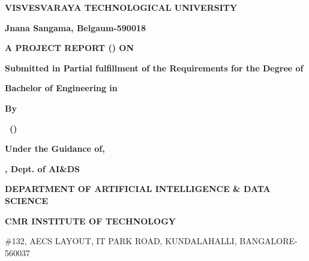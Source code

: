 \thispagestyle{empty}
\begin{center}
\vspace*{0.5cm}
{\Large\bfseries VISVESVARAYA TECHNOLOGICAL UNIVERSITY\par}
{\large\bfseries Jnana Sangama, Belgaum-590018\par}
\vfill
{}\par
\vfill
{\bfseries\textcolor{titleBlue}{A PROJECT REPORT (\CourseCode) ON}\par}
\vspace{0.5em}
{\Large\bfseries\textcolor{titleBlue}{\ThesisTitleCover}\par}
\vfill
{\bfseries Submitted in Partial fulfillment of the Requirements for the Degree of\par}
{\bfseries Bachelor of Engineering in \DegreeName\par}
\vfill
{\bfseries By\par}
{\bfseries\textcolor{nameBrown}{\StudentName\ (\USN)}\par}
\vfill
{\bfseries\textcolor{titleBlue}{Under the Guidance of,}\par}
{\bfseries\textcolor{titleBlue}{\GuideName}\par}
{\bfseries\textcolor{titleBlue}{\GuideTitle, Dept. of AI\&DS}\par}
\vfill
{}\par
\vfill
{\bfseries\textcolor{deptRed}{DEPARTMENT OF ARTIFICIAL INTELLIGENCE \& DATA SCIENCE}\par}
{\bfseries CMR INSTITUTE OF TECHNOLOGY\par}
{\small \#132, AECS LAYOUT, IT PARK ROAD, KUNDALAHALLI, BANGALORE-560037\par}
\vspace*{0.3cm}
\end{center}
\clearpage

